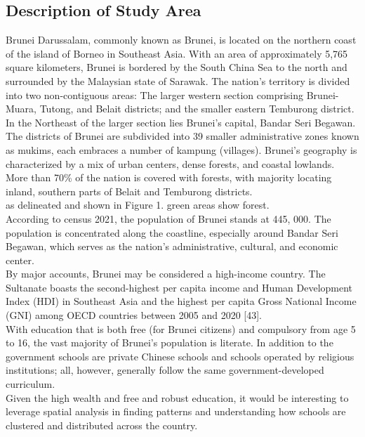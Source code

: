 \documentclass[12pt]{article}
\begin{document}
\subsection{Description of Study Area}
Brunei Darussalam, commonly known as Brunei, is located on the northern coast of the island of Borneo in Southeast Asia. With an area of approximately 5,765 square kilometers, Brunei is bordered by the South China Sea to the north and surrounded by the Malaysian state of Sarawak. The nation’s territory is divided into two non-contiguous areas:  The larger western section comprising Brunei-Muara, Tutong, and Belait districts; and the smaller eastern Temburong district. In the Northeast of the larger section lies Brunei's capital, Bandar Seri Begawan. \\

The districts of Brunei are subdivided into 39 smaller administrative zones known as mukims, each embraces a number of kampung (villages). Brunei’s geography is characterized by a mix of urban centers, dense forests, and coastal lowlands. More than 70\% of the nation is covered with forests, with majority locating inland, southern parts of Belait and Temburong districts. \\

as delineated and shown in Figure 1. green areas show forest. \\

According to census 2021, the population of Brunei stands at 445, 000. The population is concentrated along the coastline, especially around Bandar Seri Begawan, which serves as the nation’s administrative, cultural, and economic center. \\

By major accounts, Brunei may be considered a high-income country. The Sultanate boasts the second-highest per capita income and Human Development Index (HDI) in Southeast Asia and the highest per capita Gross National Income (GNI) among OECD countries between 2005 and 2020 [43]. \\
 
With education that is both free (for Brunei citizens) and compulsory from age 5 to 16, the vast majority of Brunei’s population is literate. In addition to the government schools are private Chinese schools and schools operated by religious institutions; all, however, generally follow the same government-developed curriculum. \\

Given the high wealth and free and robust education, it would be interesting to leverage spatial analysis in finding patterns and understanding how schools are clustered and distributed across the country.\\
\end{document}
